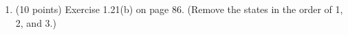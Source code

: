 \documentclass[11pt]{article}
\begin{document}
\begin{enumerate}
 \item (10 points) Exercise 1.21(b) on page 86. (Remove the states in the order of 1, 2, and 3.)


\end{enumerate}
\end{document}
